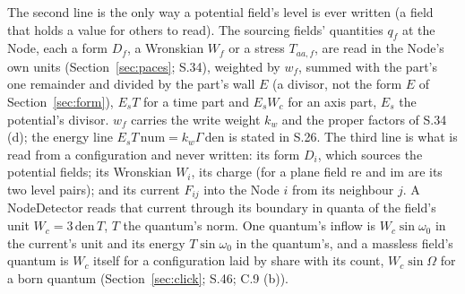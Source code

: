 \documentclass[pdflatex,sn-mathphys-num]{sn-jnl}
\newcommand{\num}{\mathrm{num}}
\newcommand{\den}{\mathrm{den}}
\newcommand{\Wc}{W_c}
\theoremstyle{thmstyleone}
\theoremstyle{thmstyletwo}
\begin{document}
The second line is the only way a potential field's level is ever written (a field that holds a value for others to read). The sourcing fields' quantities $q_f$ at the Node, each a form $D_f$, a Wronskian $W_f$ or a stress $T_{aa,f}$, are read in the Node's own units (Section~\ref{sec:paces}; S.34), weighted by $w_f$, summed with the part's one remainder and divided by the part's wall $E$ (a divisor, not the form $E$ of Section~\ref{sec:form}), $E_s T$ for a time part and $E_s \Wc$ for an axis part, $E_s$ the potential's divisor. $w_f$ carries the write weight $k_w$ and the proper factors of S.34 (d); the energy line $E_s T\,\num = k_w\Gamma\,\den$ is stated in S.26. The third line is what is read from a configuration and never written: its form $D_i$, which sources the potential fields; its Wronskian $W_i$, its charge (for a plane field $\mathrm{re}$ and $\mathrm{im}$ are its two level pairs); and its current $F_{ij}$ into the Node $i$ from its neighbour $j$. A NodeDetector reads that current through its boundary in quanta of the field's unit $\Wc = 3\,\den\,T$, $T$ the quantum's norm. One quantum's inflow is $\Wc\sin\omega_0$ in the current's unit and its energy $T\sin\omega_0$ in the quantum's, and a massless field's quantum is $\Wc$ itself for a configuration laid by share with its count, $\Wc\sin\Omega$ for a born quantum (Section~\ref{sec:click}; S.46; C.9 (b)).
\end{document}
